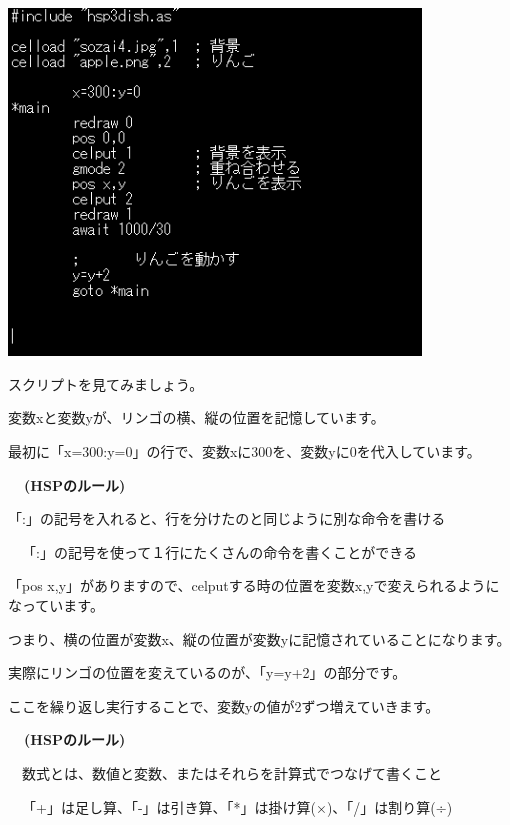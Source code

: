 \documentclass[a4paper,12pt]{jarticle}
\begin{document}
\bigskip
\bigskip

\begin{minipage}{9.781cm}
\centering
{\upshape
\includegraphics[keepaspectratio,width=10.954cm,height=9.213cm]{text04-img/text04-img020.png}}
\end{minipage}

\bigskip
\bigskip
\bigskip

スクリプトを見てみましょう。

\bigskip

変数xと変数yが、リンゴの横、縦の位置を記憶しています。

最初に「x=300:y=0」の行で、変数xに300を、変数yに0を代入しています。


\bigskip

{\bfseries
\ \ (HSPのルール)

\bigskip

「:」の記号を入れると、行を分けたのと同じように別な命令を書ける

\ \ 「:」の記号を使って１行にたくさんの命令を書くことができる}


\bigskip

「pos x,y」がありますので、celputする時の位置を変数x,yで変えられるようになっています。

つまり、横の位置が変数x、縦の位置が変数yに記憶されていることになります。


\bigskip

実際にリンゴの位置を変えているのが、「y=y+2」の部分です。

ここを繰り返し実行することで、変数yの値が2ずつ増えていきます。


\bigskip

{\bfseries
\ \ (HSPのルール)

\bigskip

\ \ 数式とは、数値と変数、またはそれらを計算式でつなげて書くこと

\ \ 「+」は足し算、「-」は引き算、「*」は掛け算(×)、「/」は割り算(÷) }
\end{document}
